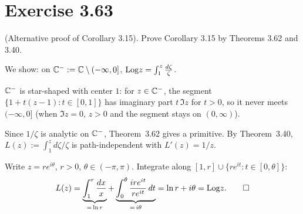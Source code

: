 \documentclass{article}
\begin{document}
\section{Exercise 3.63}

(Alternative proof of Corollary 3.15).
Prove Corollary 3.15 by Theorems 3.62 and 3.40.

\begin{solution}
	We show: on $\mathbb{C}^-:=\mathbb{C}\setminus(-\infty,0]$,
	$\mathrm{Log} z=\int_1^z\frac{d\zeta}{\zeta}$.

	\smallskip

	$\mathbb{C}^-$ is star-shaped with center $1$:
	for $z\in\mathbb{C}^-$, the segment
	$\{1+t(z-1):t\in[0,1]\}$ has imaginary part
	$t\,\Im z$ for $t>0$, so it never meets $(-\infty,0]$
	(when $\Im z=0$, $z>0$ and the segment stays on
	$(0,\infty)$).

	Since $1/\zeta$ is analytic on $\mathbb{C}^-$,
	Theorem~3.62 gives a primitive.
	By Theorem~3.40,
	$L(z):=\int_1^z d\zeta/\zeta$ is path-independent
	with $L'(z)=1/z$.

	Write $z=re^{i\theta}$, $r>0$, $\theta\in(-\pi,\pi)$.
	Integrate along $[1,r]\cup\{re^{it}:t\in[0,\theta]\}$:
	\[
		L(z)
		=\underbrace{\int_1^r\frac{dx}{x}}_{=\,\ln r}
		+\underbrace{\int_0^\theta
		\frac{ire^{it}}{re^{it}}\,dt}_{=\,i\theta}
		=\ln r+i\theta
		=\mathrm{Log} z.\qedhere
	\]
\end{solution}
\end{document}
